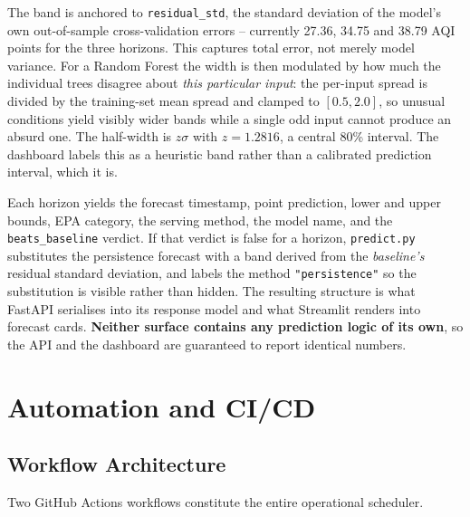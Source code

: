\documentclass[11pt,a4paper]{article}
\begin{document}
\begin{description}[leftmargin=1.4em,style=nextline,itemsep=4pt]
\item[Step 5 -- Derive an uncertainty band.]
The band is anchored to \texttt{residual\_std}, the standard deviation of the
model's own out-of-sample cross-validation errors -- currently 27.36, 34.75 and
38.79 AQI points for the three horizons. This captures total error, not merely
model variance. For a Random Forest the width is then modulated by how much the
individual trees disagree about \emph{this particular input}: the per-input
spread is divided by the training-set mean spread and clamped to $[0.5, 2.0]$,
so unusual conditions yield visibly wider bands while a single odd input cannot
produce an absurd one. The half-width is $z\sigma$ with $z = 1.2816$, a central
80\% interval. The dashboard labels this as a heuristic band rather than a
calibrated prediction interval, which it is.

\item[Step 6 -- Return a uniform result.]
Each horizon yields the forecast timestamp, point prediction, lower and upper
bounds, EPA category, the serving method, the model name, and the
\texttt{beats\_baseline} verdict. If that verdict is false for a horizon,
\texttt{predict.py} substitutes the persistence forecast with a band derived
from the \emph{baseline's} residual standard deviation, and labels the method
\texttt{"persistence"} so the substitution is visible rather than hidden. The
resulting structure is what FastAPI serialises into its response model and what
Streamlit renders into forecast cards. \textbf{Neither surface contains any
prediction logic of its own}, so the API and the dashboard are guaranteed to
report identical numbers.

\end{description}

\section{Automation and CI/CD}

\subsection{Workflow Architecture}

Two GitHub Actions workflows constitute the entire operational scheduler.
\end{document}
